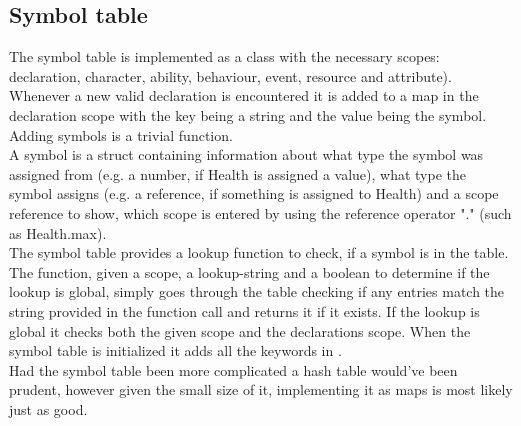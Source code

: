 \subsection{Symbol table}
The symbol table is implemented as a class with the necessary scopes: declaration, character, ability, behaviour, event, resource and attribute). Whenever a new valid declaration is encountered it is added to a map in the declaration scope with the key being a string and the value being the symbol. Adding symbols is a trivial function.\\
A symbol is a struct containing information about what type the symbol was assigned from (e.g. a number, if Health is assigned a value), what type the symbol assigns (e.g. a reference, if something is assigned to Health) and a scope reference to show, which scope is entered by using the reference operator "." (such as Health.max).\\
The symbol table provides a lookup function to check, if a symbol is in the table. The function, given a scope, a lookup-string and a boolean to determine if the lookup is global, simply goes through the table checking if any entries match the string provided in the function call and returns it if it exists. If the lookup is global it checks both the given scope and the declarations scope. When the symbol table is initialized it adds all the keywords in \langname{}.\\
Had the symbol table been more complicated a hash table would've been prudent, however given the small size of it, implementing it as maps is most likely just as good.